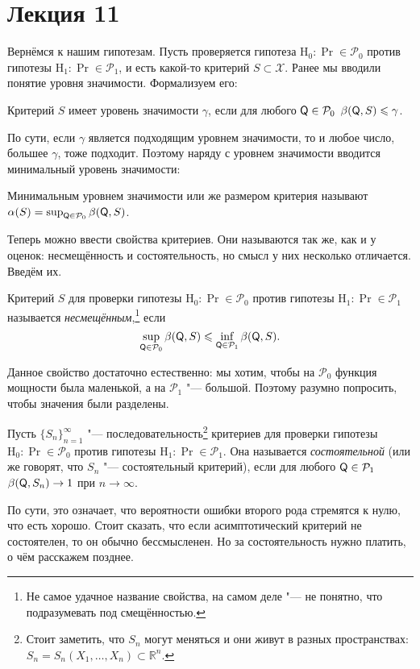
\section{Лекция 11}
Вернёмся к нашим гипотезам. Пусть проверяется гипотеза $\mathrm{H}_{0} \colon \Pr \in \mathcal{P}_{0}$ против гипотезы $\mathrm{H}_{1} \colon \Pr \in \mathcal{P}_{1}$, и есть какой-то критерий $S \subset \mathcal{X}$. Ранее мы вводили понятие уровня значимости. Формализуем его:
\begin{definition}
	Критерий $S$ имеет уровень значимости $\gamma$, если для любого $\mathsf{Q} \in \mathcal{P}_{0}$ $\beta(\mathsf{Q}, S) \leqslant \gamma$.
\end{definition}
По сути, если $\gamma$ является подходящим уровнем значимости, то и любое число, большее $\gamma$, тоже подходит. Поэтому наряду с уровнем значимости вводится минимальный уровень значимости:
\begin{definition}
	Минимальным уровнем значимости или же размером критерия называют $\alpha(S) = \sup_{\mathsf{Q} \in \mathcal{P}_{0}} \beta(\mathsf{Q}, S)$.
\end{definition}
Теперь можно ввести свойства критериев. Они называются так же, как и у оценок: несмещённость и состоятельность, но смысл у них несколько отличается. Введём их.
\begin{definition}
	Критерий $S$ для проверки гипотезы $\mathrm{H}_{0} \colon \Pr \in \mathcal{P}_{0}$ против гипотезы $\mathrm{H}_{1} \colon \Pr \in \mathcal{P}_{1}$ называется \emph{несмещённым},\footnote{Не самое удачное название свойства, на самом деле "--- не понятно, что подразумевать под смещённостью.} если
	\begin{equation}
		\sup_{\mathsf{Q} \in \mathcal{P}_{0}} \beta(\mathsf{Q}, S) \leqslant \inf_{\mathsf{Q} \in \mathcal{P}_{1}} \beta(\mathsf{Q}, S).
	\end{equation}
\end{definition}
Данное свойство достаточно естественно: мы хотим, чтобы на $\mathcal{P}_{0}$ функция мощности была маленькой, а на $\mathcal{P}_{1}$ "--- большой. Поэтому разумно попросить, чтобы значения были разделены.
\begin{definition}
	Пусть $\{S_{n}\}_{n = 1}^{\infty}$ "--- последовательность\footnote{Стоит заметить, что $S_{n}$ могут меняться и они живут в разных пространствах: $S_{n} = S_{n}(X_{1}, \ldots, X_{n}) \subset \mathbb{R}^{n}$.} критериев для проверки гипотезы $\mathrm{H}_{0} \colon \Pr \in \mathcal{P}_{0}$ против гипотезы $\mathrm{H}_{1} \colon \Pr \in \mathcal{P}_{1}$. Она называется \emph{состоятельной} (или же говорят, что $S_{n}$ "--- состоятельный критерий), если для любого $\mathsf{Q} \in \mathcal{P}_{1}$ $\beta(\mathsf{Q}, S_{n}) \to 1$ при $n \to \infty$.
\end{definition}
По сути, это означает, что вероятности ошибки второго рода стремятся к нулю, что есть хорошо. Стоит сказать, что если асимптотический критерий не состоятелен, то он обычно бессмысленен. Но за состоятельность нужно платить, о чём расскажем позднее.

